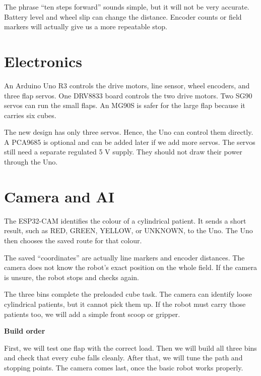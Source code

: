 \documentclass[12pt]{article}
\begin{document}
The phrase ``ten steps forward'' sounds simple, but it will not be very accurate. Battery level and wheel slip can change the distance. Encoder counts or field markers will actually give us a more repeatable stop.

\newpage
\section*{Electronics}

An Arduino Uno R3 controls the drive motors, line sensor, wheel encoders, and three flap servos. One DRV8833 board controls the two drive motors. Two SG90 servos can run the small flaps. An MG90S is safer for the large flap because it carries six cubes.

The new design has only three servos. Hence, the Uno can control them directly. A PCA9685 is optional and can be added later if we add more servos. The servos still need a separate regulated 5 V supply. They should not draw their power through the Uno.

\section*{Camera and AI}

The ESP32-CAM identifies the colour of a cylindrical patient. It sends a short result, such as RED, GREEN, YELLOW, or UNKNOWN, to the Uno. The Uno then chooses the saved route for that colour.

The saved ``coordinates'' are actually line markers and encoder distances. The camera does not know the robot's exact position on the whole field. If the camera is unsure, the robot stops and checks again.

The three bins complete the preloaded cube task. The camera can identify loose cylindrical patients, but it cannot pick them up. If the robot must carry those patients too, we will add a simple front scoop or gripper.

\par\medskip
{\large\bfseries Build order}\par\smallskip

First, we will test one flap with the correct load. Then we will build all three bins and check that every cube falls cleanly. After that, we will tune the path and stopping points. The camera comes last, once the basic robot works properly.
\end{document}
